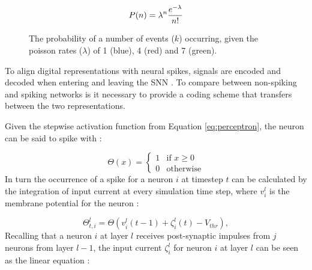 \documentclass[report.tex]{subfiles}
\begin{document}
\begin{equation}
P(n) = \lambda^n {e^{-\lambda} \over n!}
\label{eq:poisson}
\end{equation}

\begin{figure}
\centering
{}
\caption{The probability of a number of events ($k$) occurring, given the
poisson rates ($\lambda$) of 1 (blue), 4 (red) and 7 (green).}
\label{fig:poisson}
\end{figure}

To align digital representations with neural spikes,
signals are encoded and decoded when entering and leaving the \gls{SNN}
\cite{Dayan2001}.
To compare between non-spiking and spiking networks is it necessary to 
provide a coding scheme that transfers between the two representations.

Given the stepwise activation function from Equation \ref{eq:perceptron},
the neuron can be said to spike with \cite[p. 3]{Diehl2015, Rueckauer2017}:

\begin{equation}
\Theta(x) = \begin{cases}
  	1 & \text{if } x \geq 0 \\
	0 & \text{otherwise}
	\end{cases}
\label{eq:spike_theta}
\end{equation}
\noindent
In turn the occurrence of a spike for a neuron $i$ at timestep $t$ can be
calculated by the integration of input current at every simulation time step, where
$v_i^l$ is the membrane potential for the neuron \cite[p. 3]{Rueckauer2017}:

\begin{equation}
\Theta^l_{t,i} = \Theta(v^l_i (t-1) + \zeta^l_i(t) - V_{thr}),
\label{eq:current_timestep}
\end{equation}
\noindent
Recalling that a neuron $i$ at layer $l$ receives post-synaptic
impulses from $j$ neurons from layer $l - 1$, the input current $\zeta^l_i$ for neuron $i$
at layer $l$ can be seen as the linear equation
\cite[p. 3]{Rueckauer2017}:
\end{document}
